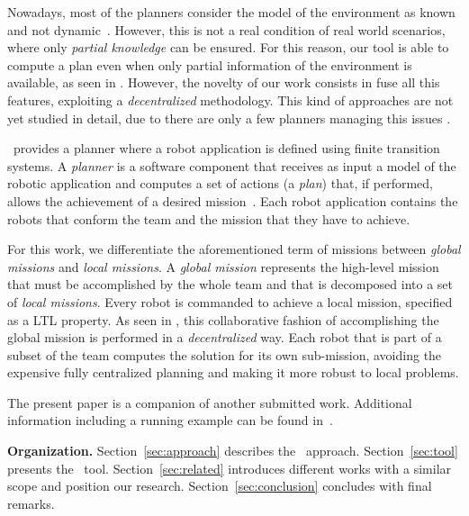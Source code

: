 Nowadays, most of the planners consider the model of the environment as known and not dynamic~\cite{7139412}. 
However, this is not a real condition of real world scenarios, where only \emph{partial knowledge} can be ensured.
For this reason, our tool is able to compute a plan even when only partial information of the environment is available, as seen in \cite{roy2006planning,du2012robot,diaz2001exploring}.
However, the novelty of our work consists in fuse all this features, exploiting a \emph{decentralized} methodology.
This kind of approaches are not yet studied in detail, due to there are only a few planners managing this issues \cite{guo2015multi}.

\toolName\ provides a planner where a robot application is defined using finite transition systems.
A \emph{planner} is  a software component that receives as input a model of the robotic application and computes  a set of actions (a \emph{plan}) that, if performed, allows the achievement of a desired mission~\cite{latombe2012robot}.
Each robot application contains the robots that conform the team and the mission that they have to achieve.

For this work, we differentiate the aforementioned term of missions between \emph{global missions} and \emph{local missions}.
A \emph{global mission} represents the high-level mission that must be accomplished by the whole team \cite{kloetzer2011multi,loizou2005automated,quottrup2004multi} and that is decomposed into a set of \emph{local missions}\cite{schillinger2016decomposition,guo2015multi,guo2015multi,tumova2016multi}.
Every robot is commanded to achieve a local mission, specified as a LTL property.
As seen in \cite{tumova2016multi}, this collaborative fashion of accomplishing the global mission is performed in a \emph{decentralized} way.
Each robot that is part of a subset of the team computes the solution for its own sub-mission, avoiding the expensive fully centralized planning and making it more robust to local problems.

The present paper is a companion of another submitted work.
Additional information including a running example can be found in~\cite{mapmaker17}.

\textbf{Organization.} 
Section~\ref{sec:approach} describes the \toolName\ approach.
Section~\ref{sec:tool} presents the \toolName\ tool.
Section~\ref{sec:related} introduces different works with a similar scope and position our research.
Section~\ref{sec:conclusion} concludes with final remarks.

